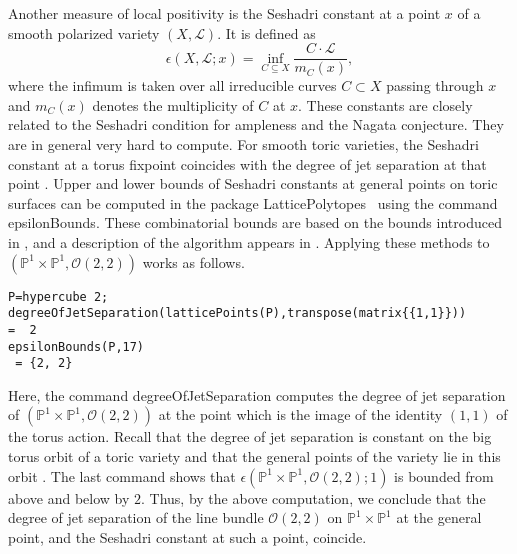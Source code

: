 \documentclass{amsart}
\begin{document}
Another measure of local positivity is the Seshadri constant at a point $x$ of a smooth polarized variety $(X,{\mathscr{L}})$. It is defined as 
\[\epsilon(X,{\mathscr{L}};x)=\inf_{C\subseteq X} \frac{C\cdot {\mathscr{L}}}{m_C(x)},\] 
where the infimum is taken over all irreducible curves $C\subset X$ passing through $x$ and $m_C(x)$ denotes the multiplicity of $C$ at $x$. These constants are closely related to the Seshadri condition for ampleness and the Nagata conjecture. They are in general very hard to compute. For smooth toric varieties, the Seshadri constant at a torus fixpoint coincides with the degree of jet separation at that point \cite{primer}. Upper and lower bounds of Seshadri constants at general points on toric surfaces can be computed in the package {\textsf{LatticePolytopes}\ } using the command \textsf{epsilonBounds}. These combinatorial bounds are based on the bounds introduced in \cite{degen}, and a description of the algorithm appears in \cite[Algorithm~2]{localpos}. Applying these methods to $({\mathbb{P}}^1\times {\mathbb{P}}^1,{\mathscr{O}}(2,2))$ works as follows.
\begin{verbatim}
P=hypercube 2;
degreeOfJetSeparation(latticePoints(P),transpose(matrix{{1,1}}))
=  2
epsilonBounds(P,17)
 = {2, 2}
\end{verbatim}
Here, the command \textsf{degreeOfJetSeparation} computes the degree of jet separation of $({\mathbb{P}}^1 \times {\mathbb{P}}^1,{\mathscr{O}}(2,2))$ at the point which is the image of the identity $(1,1)$ of the torus action. Recall that the  degree of jet separation is constant on the big torus orbit of a toric variety and that the general points of the variety lie in this orbit \cite{Perkinson}. The last command shows that $\epsilon({\mathbb{P}}^1\times {\mathbb{P}}^1,{\mathscr{O}}(2,2);1)$ is bounded from above and below by $2$. Thus, by the above computation, we conclude that the degree of jet separation of the line bundle ${\mathscr{O}}(2,2)$ on ${\mathbb{P}}^1\times {\mathbb{P}}^1$ at the general point, and the Seshadri constant at such a point, coincide.
\end{document}
